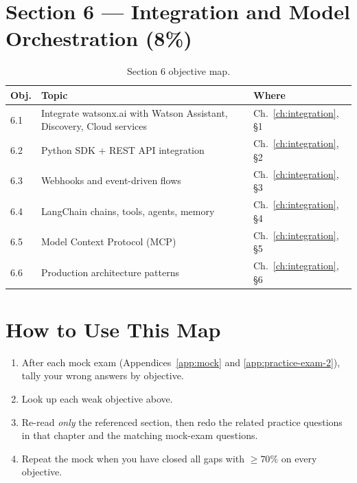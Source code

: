 \section*{Section 6 --- Integration and Model Orchestration (8\%)}

\begin{table}[h]
\centering
\small
\begin{tabularx}{\textwidth}{l X l}
\toprule
\textbf{Obj.} & \textbf{Topic} & \textbf{Where} \\
\midrule
6.1 & Integrate watsonx.ai with Watson Assistant, Discovery, Cloud services & Ch.~\ref{ch:integration}, \S 1 \\
6.2 & Python SDK + REST API integration         & Ch.~\ref{ch:integration}, \S 2 \\
6.3 & Webhooks and event-driven flows           & Ch.~\ref{ch:integration}, \S 3 \\
6.4 & LangChain chains, tools, agents, memory   & Ch.~\ref{ch:integration}, \S 4 \\
6.5 & Model Context Protocol (MCP)              & Ch.~\ref{ch:integration}, \S 5 \\
6.6 & Production architecture patterns          & Ch.~\ref{ch:integration}, \S 6 \\
\bottomrule
\end{tabularx}
\caption{Section 6 objective map.}
\end{table}

\section*{How to Use This Map}

\begin{enumerate}[leftmargin=*]
    \item After each mock exam (Appendices~\ref{app:mock} and \ref{app:practice-exam-2}), tally your wrong answers by objective.
    \item Look up each weak objective above.
    \item Re-read \emph{only} the referenced section, then redo the related practice questions in that chapter and the matching mock-exam questions.
    \item Repeat the mock when you have closed all gaps with $\ge 70\%$ on every objective.
\end{enumerate}
